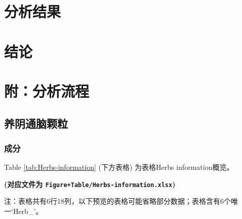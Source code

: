 \documentclass[
]{article}
\begin{document}
\hypertarget{results}{%
\section{分析结果}\label{results}}

\hypertarget{dis}{%
\section{结论}\label{dis}}

\hypertarget{workflow}{%
\section{附：分析流程}\label{workflow}}

\hypertarget{ux517bux9634ux901aux8111ux9897ux7c92}{%
\subsection{养阴通脑颗粒}\label{ux517bux9634ux901aux8111ux9897ux7c92}}

\hypertarget{ux6210ux5206}{%
\subsubsection{成分}\label{ux6210ux5206}}

Table \ref{tab:Herbs-information} (下方表格) 为表格Herbs information概览。

\textbf{(对应文件为 \texttt{Figure+Table/Herbs-information.xlsx})}

\begin{center}\begin{tcolorbox}[colback=gray!10, colframe=gray!50, width=0.9\linewidth, arc=1mm, boxrule=0.5pt]注：表格共有6行18列，以下预览的表格可能省略部分数据；表格含有6个唯一`Herb\_'。
\end{tcolorbox}
\end{center}
\end{document}
